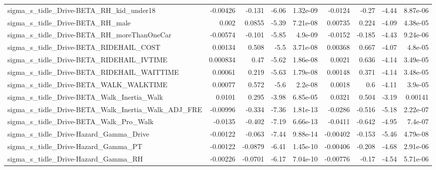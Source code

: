 \begin{tabular}{lrrrrrrrr}
sigma\_s\_tidle\_Drive-BETA\_RH\_kid\_under18            &    -0.00426 &       -0.131 &    -6.06 & 1.32e-09 &    -0.0124 &       -0.27 &        -4.44 &      8.87e-06 \\
sigma\_s\_tidle\_Drive-BETA\_RH\_male                   &       0.002 &       0.0855 &    -5.39 & 7.21e-08 &    0.00735 &       0.224 &        -4.09 &      4.38e-05 \\
sigma\_s\_tidle\_Drive-BETA\_RH\_moreThanOneCar         &    -0.00574 &       -0.101 &    -5.85 &  4.9e-09 &    -0.0152 &      -0.185 &        -4.43 &      9.24e-06 \\
sigma\_s\_tidle\_Drive-BETA\_RIDEHAIL\_COST             &     0.00134 &        0.508 &     -5.5 & 3.71e-08 &    0.00368 &       0.667 &        -4.07 &       4.8e-05 \\
sigma\_s\_tidle\_Drive-BETA\_RIDEHAIL\_IVTIME           &    0.000834 &         0.47 &    -5.62 & 1.86e-08 &     0.0021 &       0.636 &        -4.14 &      3.49e-05 \\
sigma\_s\_tidle\_Drive-BETA\_RIDEHAIL\_WAITTIME         &     0.00061 &        0.219 &    -5.63 & 1.79e-08 &    0.00148 &       0.371 &        -4.14 &      3.48e-05 \\
sigma\_s\_tidle\_Drive-BETA\_WALK\_WALKTIME             &     0.00077 &        0.572 &     -5.6 &  2.2e-08 &     0.0018 &         0.6 &        -4.11 &       3.9e-05 \\
sigma\_s\_tidle\_Drive-BETA\_Walk\_Inertia\_Walk         &      0.0101 &        0.295 &    -3.98 & 6.85e-05 &     0.0321 &       0.504 &        -3.19 &       0.00141 \\
sigma\_s\_tidle\_Drive-BETA\_Walk\_Inertia\_Walk\_ADJ\_FRE &    -0.00996 &       -0.334 &    -7.36 & 1.81e-13 &    -0.0286 &      -0.516 &        -5.18 &      2.22e-07 \\
sigma\_s\_tidle\_Drive-BETA\_Walk\_Pro\_Walk             &     -0.0135 &       -0.402 &    -7.19 & 6.66e-13 &    -0.0411 &      -0.642 &        -4.95 &       7.4e-07 \\
sigma\_s\_tidle\_Drive-Hazard\_Gamma\_Drive             &    -0.00122 &       -0.063 &    -7.44 & 9.88e-14 &   -0.00402 &      -0.153 &        -5.46 &      4.79e-08 \\
sigma\_s\_tidle\_Drive-Hazard\_Gamma\_PT                &    -0.00122 &      -0.0879 &    -6.41 & 1.45e-10 &   -0.00406 &      -0.208 &        -4.68 &      2.91e-06 \\
sigma\_s\_tidle\_Drive-Hazard\_Gamma\_RH                &    -0.00226 &      -0.0701 &    -6.17 & 7.04e-10 &   -0.00776 &       -0.17 &        -4.54 &      5.71e-06 \\

\end{tabular}
